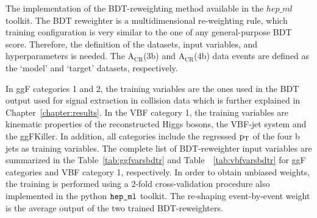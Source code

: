 The implementation of the BDT-reweighting method available in the $hep\_ml$ toolkit. The BDT reweighter is a multidimensional re-weighting rule, which training configuration is very similar to the one of any general-purpose BDT score. Therefore, the definition of the datasets, input variables, and hyperparameters is needed. The $\mathrm{A_{CR}}$(3b) and $\mathrm{A_{CR}}$(4b) data events are defined as the `model' and `target' datasets, respectively.

In ggF categories 1 and 2, the training variables are the ones used in the BDT output used for signal extraction in collision data which is further explained in Chapter~\ref{chapter:results}. In the VBF category 1, the training variables are kinematic properties of the reconstructed Higgs bosons, the VBF-jet system and the ggFKiller. In addition, all categories include the regressed $\mathrm{p_{T}}$ of the four b jets as training variables. The complete list of BDT-reweighter input variables are summarized in the Table~\ref{tab:ggfvarsbdtr} and Table~~\ref{tab:vbfvarsbdtr} for ggF categories and VBF category 1, respectively. In order to obtain unbiased weights, the training is performed using a 2-fold cross-validation procedure also implemented in the python $\verb|hep_ml|$ toolkit. The re-shaping event-by-event weight is the average output of the two trained BDT-reweighters.

